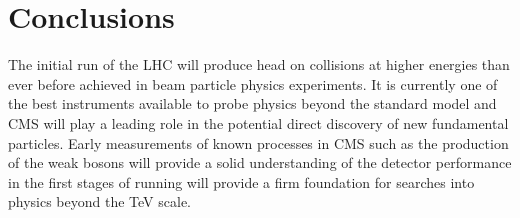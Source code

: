 \documentclass[a4paper,10pt]{article}
\begin{document}
\section{Conclusions}
The initial run of the LHC will produce head on collisions at higher energies than ever before achieved in beam particle physics experiments. It is currently one of the best instruments available
to probe physics beyond the standard model and CMS will play a leading role in the potential direct discovery of new fundamental particles. Early measurements of known processes in CMS such as the production
of the weak bosons will provide a solid understanding of the detector performance in the first stages of running will provide a firm foundation for searches into physics beyond the TeV scale. 
  



\end{document}
